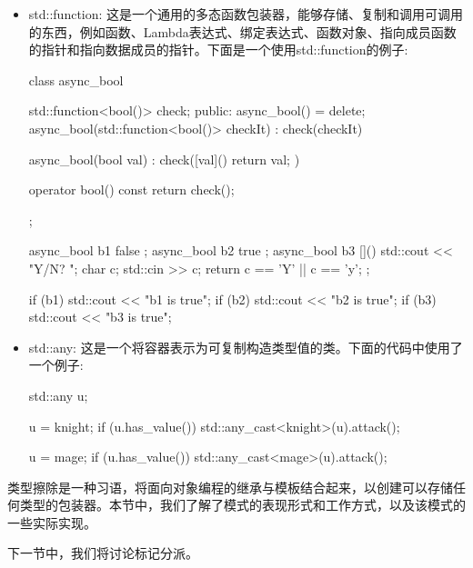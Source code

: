 \begin{itemize}
\item
std::function: 这是一个通用的多态函数包装器，能够存储、复制和调用可调用的东西，例如函数、Lambda表达式、绑定表达式、函数对象、指向成员函数的指针和指向数据成员的指针。下面是一个使用std::function的例子:

\begin{cpp}
class async_bool
{
	std::function<bool()> check;
public:
	async_bool() = delete;
	async_bool(std::function<bool()> checkIt)
		: check(checkIt)
	{ }
	
	async_bool(bool val)
		: check([val]() {return val; })
	{ }
	
	operator bool() const { return check(); }
};

async_bool b1{ false };
async_bool b2{ true };
async_bool b3{ []() { std::cout << "Y/N? ";
					  char c; std::cin >> c;
					  return c == 'Y' || c == 'y'; } };
				  
if (b1) { std::cout << "b1 is true\n"; }
if (b2) { std::cout << "b2 is true\n"; }
if (b3) { std::cout << "b3 is true\n"; }
\end{cpp}

\item
std::any: 这是一个将容器表示为可复制构造类型值的类。下面的代码中使用了一个例子:

\begin{cpp}
std::any u;

u = knight{};
if (u.has_value())
	std::any_cast<knight>(u).attack();

u = mage{};
if (u.has_value())
	std::any_cast<mage>(u).attack();
\end{cpp}
\end{itemize}

类型擦除是一种习语，将面向对象编程的继承与模板结合起来，以创建可以存储任何类型的包装器。本节中，我们了解了模式的表现形式和工作方式，以及该模式的一些实际实现。

下一节中，我们将讨论标记分派。




